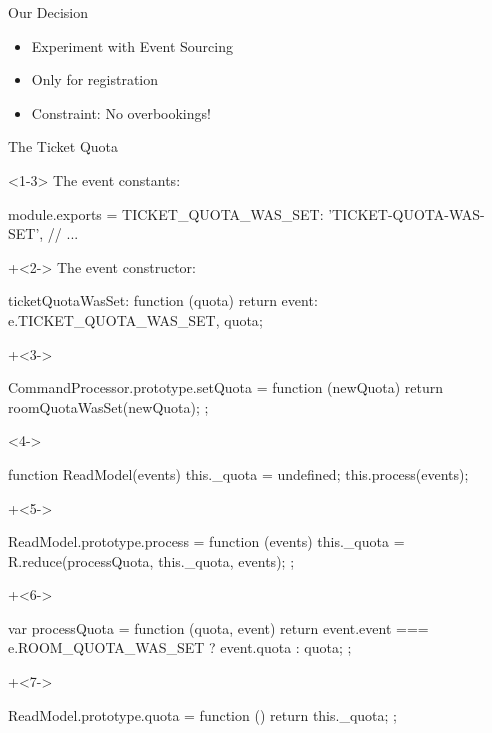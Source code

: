 \begin{frame}[fragile]{Our Decision}

\begin{itemize}
\item Experiment with Event Sourcing
\item Only for registration
\item Constraint: No overbookings!
\end{itemize}

\end{frame}


\begin{frame}[fragile]{The Ticket Quota}

\begin{onlyenv}<1-3>
The event constants:

\begin{highlight}{1}
module.exports = {
  TICKET_QUOTA_WAS_SET: 'TICKET-QUOTA-WAS-SET',
  // ...
}
\end{highlight}

\onslide+<2->
The event constructor:

\begin{highlight}{2}
ticketQuotaWasSet: function (quota) {
    return {event: e.TICKET_QUOTA_WAS_SET, quota};
}
\end{highlight}

\onslide+<3->
\begin{highlight}{3}
CommandProcessor.prototype.setQuota = function (newQuota) {
  return roomQuotaWasSet(newQuota);
};
\end{highlight}
\end{onlyenv}

\begin{onlyenv}<4->
\begin{highlight}{4}
function ReadModel(events) {
  this._quota = undefined;
  this.process(events);
}
\end{highlight}
\onslide+<5->
\begin{highlight}{5}
ReadModel.prototype.process = function (events) {
  this._quota = R.reduce(processQuota, this._quota, events);
};
\end{highlight}
\onslide+<6->
\begin{highlight}{6}
var processQuota = function (quota, event) {
  return event.event === e.ROOM_QUOTA_WAS_SET ? event.quota : quota;
};
\end{highlight}
\onslide+<7->
\begin{highlight}{7}
ReadModel.prototype.quota = function () {
  return this._quota;
};
\end{highlight}
\end{onlyenv}

\end{frame}


